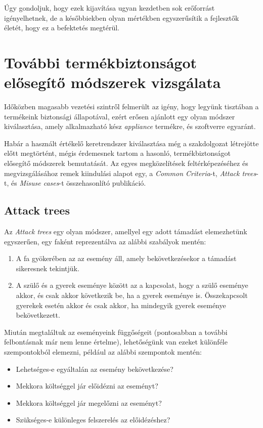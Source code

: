 Úgy gondoljuk, hogy ezek kijavítása ugyan kezdetben sok erőforrást igényelhetnek, de a későbbiekben
olyan mértékben egyszerűsítik a fejlesztők életét, hogy ez a befektetés megtérül.

\section{További termékbiztonságot elősegítő módszerek vizsgálata}

Időközben magasabb vezetési szintről felmerült az igény, hogy legyünk tisztában a termékeink
biztonsági állapotával, ezért erősen ajánlott egy olyan módszer kiválasztása, amely alkalmazható
kész \emph{appliance} termékre, és szoftverre egyaránt.

Habár a használt értékelő keretrendszer kiválasztása még a szakdolgozat létrejötte előtt megtörtént,
mégis érdemesnek tartom a hasonló, termékbiztonságot elősegítő módszerek bemutatását. Az egyes
megközelítések feltérképezéséhez és megvizsgálásához remek kiindulási alapot egy, a \emph{Common
Criteria}-t, \emph{Attack trees}-t, és \emph{Misuse cases}-t összehasonlító publikáció.
\cite{ThreeApproaches}

\subsection{Attack trees}

Az \emph{Attack trees} egy olyan módszer, amellyel egy adott támadást elemezhetünk egyszerűen, egy
faként reprezentálva az alábbi szabályok mentén:
\begin{enumerate}
    \item A fa gyökerében az az esemény áll, amely bekövetkezésekor a támadást sikeresnek tekintjük.
    \item A szülő és a gyerek eseménye között az a kapcsolat, hogy a szülő eseménye akkor, és csak
        akkor következik be, ha a gyerek eseménye is.  Összekapcsolt gyerekek esetén akkor és csak
        akkor, ha mindegyik gyerek eseménye bekövetkezett.
\end{enumerate}
Miután megtaláltuk az eseményeink függőségeit (pontosabban a további felbontásnak már nem lenne
értelme), lehetőségünk van ezeket különféle szempontokból elemezni, például az alábbi szempontok
mentén:
\begin{itemize}
    \item Lehetséges-e egyáltalán az esemény bekövetkezése?
    \item Mekkora költséggel jár előidézni az eseményt?
    \item Mekkora költséggel jár megelőzni az eseményt?
    \item Szükséges-e különleges felszerelés az előidézéshez?
\end{itemize}

